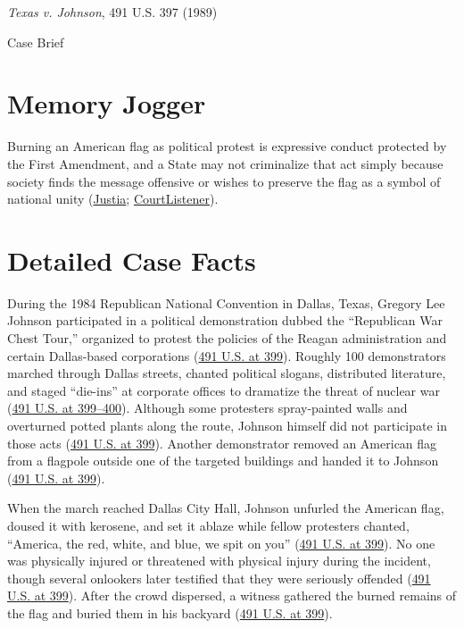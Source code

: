 \documentclass[12pt]{article}
\begin{document}
\begin{center}
{\LARGE \textit{Texas v. Johnson}, 491 U.S. 397 (1989)\par}
\vspace{0.8em}
{\large Case Brief\par}
\end{center}
\vspace{1em}

\section{Memory Jogger}
Burning an American flag as political protest is expressive conduct protected by the First Amendment, and a State may not criminalize that act simply because society finds the message offensive or wishes to preserve the flag as a symbol of national unity (\href{https://supreme.justia.com/cases/federal/us/491/397/}{Justia}; \href{https://www.courtlistener.com/opinion/112304/texas-v-johnson/}{CourtListener}).

\section{Detailed Case Facts}
During the 1984 Republican National Convention in Dallas, Texas, Gregory Lee Johnson participated in a political demonstration dubbed the ``Republican War Chest Tour,'' organized to protest the policies of the Reagan administration and certain Dallas-based corporations (\href{https://supreme.justia.com/cases/federal/us/491/397/}{491 U.S. at 399}). Roughly 100 demonstrators marched through Dallas streets, chanted political slogans, distributed literature, and staged ``die-ins'' at corporate offices to dramatize the threat of nuclear war (\href{https://supreme.justia.com/cases/federal/us/491/397/}{491 U.S. at 399--400}). Although some protesters spray-painted walls and overturned potted plants along the route, Johnson himself did not participate in those acts (\href{https://supreme.justia.com/cases/federal/us/491/397/}{491 U.S. at 399}). Another demonstrator removed an American flag from a flagpole outside one of the targeted buildings and handed it to Johnson (\href{https://supreme.justia.com/cases/federal/us/491/397/}{491 U.S. at 399}).

When the march reached Dallas City Hall, Johnson unfurled the American flag, doused it with kerosene, and set it ablaze while fellow protesters chanted, ``America, the red, white, and blue, we spit on you'' (\href{https://supreme.justia.com/cases/federal/us/491/397/}{491 U.S. at 399}). No one was physically injured or threatened with physical injury during the incident, though several onlookers later testified that they were seriously offended (\href{https://supreme.justia.com/cases/federal/us/491/397/}{491 U.S. at 399}). After the crowd dispersed, a witness gathered the burned remains of the flag and buried them in his backyard (\href{https://supreme.justia.com/cases/federal/us/491/397/}{491 U.S. at 399}).
\end{document}
